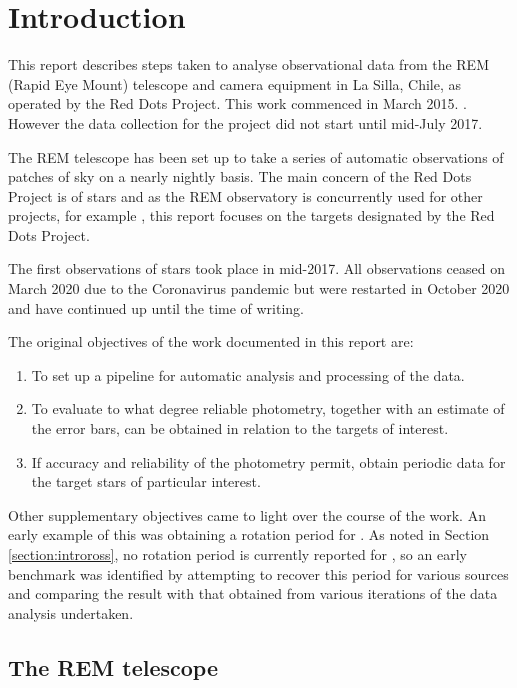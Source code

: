 \section{Introduction}
\protect\label{section:intro}

\engdate

This report describes steps taken to analyse observational data from the
REM (Rapid Eye Mount) telescope and camera equipment in La Silla, Chile, as
operated by the Red Dots Project. This work commenced in March 2015.
\citep{reddotsspace20}. However the data collection for the project did not
start until mid-July 2017.

The REM telescope has been set up to take a series of automatic
observations of patches of sky on a nearly nightly basis. The main concern of
the Red Dots Project is of {\rdwarf} stars and as the REM observatory is
concurrently used for other projects, for example \citet{giannini18}, this
report focuses on the {\rdwarf} targets designated by the Red Dots Project.

The first observations of {\rdwarf} stars took place in mid-2017. All
observations ceased on March 2020 due to the Coronavirus pandemic but were
restarted in October 2020 and have continued up until the time of writing.

The original objectives of the work documented in this report are:
\begin{enumerate}
  \item To set up a pipeline for automatic analysis and processing of the data.
  \item To evaluate to what degree reliable photometry, together with an
  estimate of the error bars, can be obtained in relation to the targets of
  interest.
  \item If accuracy and reliability of the photometry permit, obtain periodic
  data for the target stars of particular interest.
\end{enumerate}

Other supplementary objectives came to light over the course of the work. An
early example of this was obtaining a rotation period for \ross. As noted in
Section \ref{section:introross}, no rotation period is currently reported for
\ross, so an early benchmark was identified by attempting to recover this period
for various sources and comparing the result with that obtained from various
iterations of the data analysis undertaken.

\subsection{The REM telescope}
\protect\label{section:remscope}

